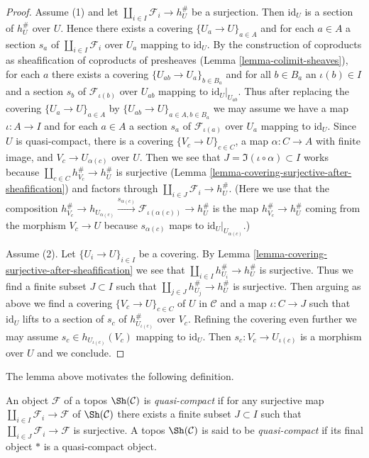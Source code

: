 \begin{proof}
Assume (1) and let $\coprod_{i \in I} \mathcal{F}_i \to h_U^\#$
be a surjection. Then $\text{id}_U$ is a section of
$h_U^\#$ over $U$. Hence there exists a covering
$\{U_a \to U\}_{a \in A}$ and for each $a \in A$
a section $s_a$ of $\coprod_{i \in I} \mathcal{F}_i$
over $U_a$ mapping to $\text{id}_U$. By the construction of coproducts as
sheafification of coproducts of presheaves
(Lemma \ref{lemma-colimit-sheaves}), for each $a$
there exists a covering $\{U_{ab} \to U_a\}_{b \in B_a}$ and
for all $b \in B_a$ an $\iota(b) \in I$ and a section
$s_{b}$ of $\mathcal{F}_{\iota(b)}$ over $U_{ab}$
mapping to $\text{id}_U|_{U_{ab}}$. Thus after replacing
the covering $\{U_a \to U\}_{a \in A}$ by
$\{U_{ab} \to U\}_{a \in A, b \in B_a}$
we may assume we have a map $\iota : A \to I$
and for each $a \in A$ a section $s_a$ of $\mathcal{F}_{\iota(a)}$
over $U_a$ mapping to $\text{id}_U$.
Since $U$ is quasi-compact, there is a covering
$\{V_c \to U\}_{c \in C}$, a map $\alpha : C \to A$
with finite image, and $V_c \to U_{\alpha(c)}$ over $U$.
Then we see that $J = \Im(\iota \circ \alpha) \subset I$ works
because $\coprod_{c \in C} h_{V_c}^\# \to h_U^\#$ is surjective
(Lemma \ref{lemma-covering-surjective-after-sheafification})
and factors through $\coprod_{i \in J} \mathcal{F}_i \to h_U^\#$.
(Here we use that the composition
$h_{V_c}^\# \to h_{U_{\alpha(c)}}
\xrightarrow{s_{\alpha(c)}} \mathcal{F}_{\iota(\alpha(c))} \to h_U^\#$
is the map $h_{V_c}^\# \to h_U^\#$ coming from the morphism
$V_c \to U$ because $s_{\alpha(c)}$ maps to $\text{id}_U|_{U_{\alpha(c)}}$.)

\medskip\noindent
Assume (2). Let $\{U_i \to U\}_{i \in I}$ be a covering.
By Lemma \ref{lemma-covering-surjective-after-sheafification}
we see that $\coprod_{i \in I} h_{U_i}^\# \to h_U^\#$ is surjective.
Thus we find a finite subset $J \subset I$ such that
$\coprod_{j \in J} h_{U_j}^\# \to h_U^\#$ is surjective.
Then arguing as above we find a covering
$\{V_c \to U\}_{c \in C}$ of $U$ in $\mathcal{C}$
and a map $\iota : C \to J$
such that $\text{id}_U$ lifts to a section
of $s_c$ of $h_{U_{\iota(c)}}^\#$ over $V_c$.
Refining the covering even further we may assume
$s_c \in h_{U_{\iota(c)}}(V_c)$ mapping to $\text{id}_U$.
Then $s_c : V_c \to U_{\iota(c)}$ is a morphism over $U$
and we conclude.
\end{proof}

\noindent
The lemma above motivates the following definition.

\begin{definition}
\label{definition-quasi-compact-topos}
An object $\mathcal{F}$ of a topos $\Sh(\mathcal{C})$ is {\it quasi-compact}
if for any surjective map $\coprod_{i \in I} \mathcal{F}_i \to \mathcal{F}$
of $\Sh(\mathcal{C})$ there exists a finite subset $J \subset I$ such
that $\coprod_{i \in J} \mathcal{F}_i \to \mathcal{F}$ is surjective.
A topos $\Sh(\mathcal{C})$ is said to be {\it quasi-compact}
if its final object $*$ is a quasi-compact object.
\end{definition}

